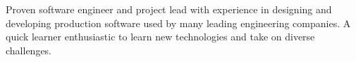 


\cvparagraph 
Proven software engineer and project lead with experience in designing and developing production software used by many leading engineering companies. A quick learner enthusiastic to learn new technologies and take on diverse challenges.